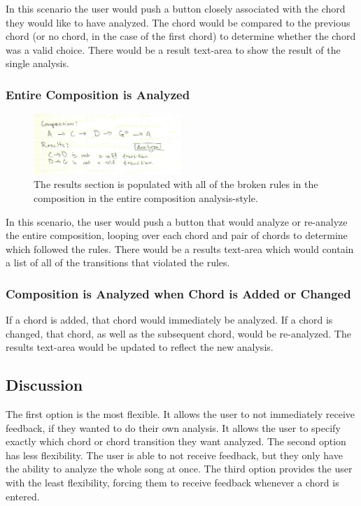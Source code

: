 \documentclass[onecolumn, draftclsnofoot,10pt, compsoc]{IEEEtran}
\begin{document}
In this scenario the user would push a button closely associated with the chord they would like to have analyzed. 
The chord would be compared to the previous chord (or no chord, in the case of the first chord) to determine whether the chord was a valid choice.
There would be a result text-area to show the result of the single analysis.
\subsubsection{Entire Composition is Analyzed}
\begin{figure}[h]
  \includegraphics[width=0.5\textwidth]{analyze-all.png}
  \caption{The results section is populated with all of the broken rules in the composition in the entire composition analysis-style.}
\end{figure}

In this scenario, the user would push a button that would analyze or re-analyze the entire composition,
looping over each chord and pair of chords to determine which followed the rules.
There would be a results text-area which would contain a list of all of the transitions that violated the rules.
\subsubsection{Composition is Analyzed when Chord is Added or Changed}
If a chord is added, that chord would immediately be analyzed.
If a chord is changed, that chord, as well as the subsequent chord, would be re-analyzed. 
The results text-area would be updated to reflect the new analysis.
\subsection{Discussion}
The first option is the most flexible. 
It allows the user to not immediately receive feedback, if they wanted to do their own analysis.
It allows the user to specify exactly which chord or chord transition they want analyzed.
The second option has less flexibility.
The user is able to not receive feedback, but they only have the ability to analyze the whole song at once.
The third option provides the user with the least flexibility, forcing them to receive feedback whenever a chord is entered.
\end{document}

